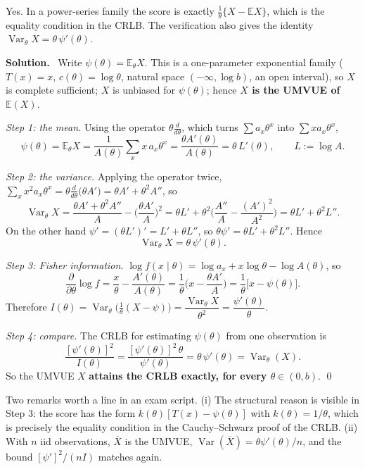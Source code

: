 \documentclass[11pt]{article}
\newcommand{\E}{\mathbb{E}}
\newcommand{\Var}{\operatorname{Var}}
\newcommand{\Xbar}{\overline{X}}
\newcommand{\soln}{\medskip\noindent\textbf{Solution.}\ }
\begin{document}
\begin{ideabox}
Yes. In a power-series family the score is exactly $\frac{1}{\theta}\{X-\E X\}$, which is the
equality condition in the CRLB. The verification also gives the identity
$\Var_\theta X=\theta\,\psi'(\theta)$.
\end{ideabox}

\soln
Write $\psi(\theta)=\E_\theta X$. This is a one-parameter exponential family
($T(x)=x$, $c(\theta)=\log\theta$, natural space $(-\infty,\log b)$, an open interval), so $X$
is complete sufficient; $X$ is unbiased for $\psi(\theta)$; hence \textbf{$X$ is the UMVUE of
$\E(X)$}.

\emph{Step 1: the mean.} Using the operator $\theta\frac{d}{d\theta}$, which turns
$\sum a_x\theta^x$ into $\sum x a_x\theta^x$,
\[
\psi(\theta)=\E_\theta X=\frac{1}{A(\theta)}\sum_x x\,a_x\theta^x
=\frac{\theta A'(\theta)}{A(\theta)}=\theta\,L'(\theta),\qquad L:=\log A .
\]

\emph{Step 2: the variance.} Applying the operator twice,
$\sum_x x^2a_x\theta^x=\theta\frac{d}{d\theta}\big(\theta A'\big)=\theta A'+\theta^2A''$, so
\[
\Var_\theta X=\frac{\theta A'+\theta^2A''}{A}-\Big(\frac{\theta A'}{A}\Big)^2
=\theta L'+\theta^2\Big(\frac{A''}{A}-\frac{(A')^2}{A^2}\Big)
=\theta L'+\theta^2L''.
\]
On the other hand $\psi'=(\theta L')'=L'+\theta L''$, so $\theta\psi'=\theta L'+\theta^2L''$.
Hence
\[
\boxed{\ \Var_\theta X=\theta\,\psi'(\theta).\ }
\]

\emph{Step 3: Fisher information.}
$\log f(x\mid\theta)=\log a_x+x\log\theta-\log A(\theta)$, so
\[
\frac{\partial}{\partial\theta}\log f=\frac{x}{\theta}-\frac{A'(\theta)}{A(\theta)}
=\frac{1}{\theta}\Big(x-\frac{\theta A'}{A}\Big)
=\frac{1}{\theta}\big[x-\psi(\theta)\big].
\]
Therefore
$I(\theta)=\Var_\theta\big(\tfrac{1}{\theta}(X-\psi)\big)=\dfrac{\Var_\theta X}{\theta^2}
=\dfrac{\psi'(\theta)}{\theta}$.

\emph{Step 4: compare.} The CRLB for estimating $\psi(\theta)$ from one observation is
\[
\frac{[\psi'(\theta)]^2}{I(\theta)}=\frac{[\psi'(\theta)]^2\,\theta}{\psi'(\theta)}
=\theta\,\psi'(\theta)=\Var_\theta(X).
\]
So the UMVUE $X$ \textbf{attains the CRLB exactly, for every $\theta\in(0,b)$}. \qed

Two remarks worth a line in an exam script. (i) The structural reason is visible in Step 3:
the score has the form $k(\theta)[T(x)-\psi(\theta)]$ with $k(\theta)=1/\theta$, which is
precisely the equality condition in the Cauchy--Schwarz proof of the CRLB. (ii) With $n$ iid
observations, $\Xbar$ is the UMVUE, $\Var(\Xbar)=\theta\psi'(\theta)/n$, and the bound
$[\psi']^2/(nI)$ matches again.
\end{document}
